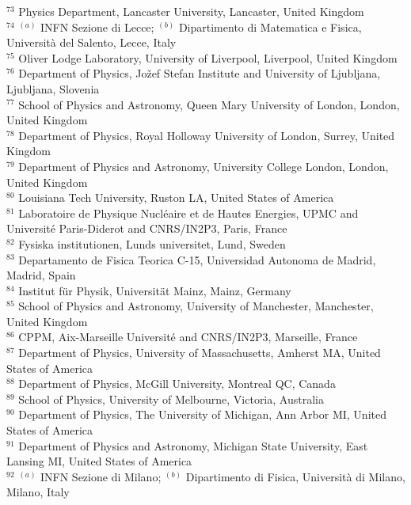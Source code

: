 \begin{flushleft}
$^{73}$ Physics Department, Lancaster University, Lancaster, United Kingdom\\
$^{74}$ $^{(a)}$ INFN Sezione di Lecce; $^{(b)}$ Dipartimento di Matematica e Fisica, Universit{\`a} del Salento, Lecce, Italy\\
$^{75}$ Oliver Lodge Laboratory, University of Liverpool, Liverpool, United Kingdom\\
$^{76}$ Department of Physics, Jo{\v{z}}ef Stefan Institute and University of Ljubljana, Ljubljana, Slovenia\\
$^{77}$ School of Physics and Astronomy, Queen Mary University of London, London, United Kingdom\\
$^{78}$ Department of Physics, Royal Holloway University of London, Surrey, United Kingdom\\
$^{79}$ Department of Physics and Astronomy, University College London, London, United Kingdom\\
$^{80}$ Louisiana Tech University, Ruston LA, United States of America\\
$^{81}$ Laboratoire de Physique Nucl{\'e}aire et de Hautes Energies, UPMC and Universit{\'e} Paris-Diderot and CNRS/IN2P3, Paris, France\\
$^{82}$ Fysiska institutionen, Lunds universitet, Lund, Sweden\\
$^{83}$ Departamento de Fisica Teorica C-15, Universidad Autonoma de Madrid, Madrid, Spain\\
$^{84}$ Institut f{\"u}r Physik, Universit{\"a}t Mainz, Mainz, Germany\\
$^{85}$ School of Physics and Astronomy, University of Manchester, Manchester, United Kingdom\\
$^{86}$ CPPM, Aix-Marseille Universit{\'e} and CNRS/IN2P3, Marseille, France\\
$^{87}$ Department of Physics, University of Massachusetts, Amherst MA, United States of America\\
$^{88}$ Department of Physics, McGill University, Montreal QC, Canada\\
$^{89}$ School of Physics, University of Melbourne, Victoria, Australia\\
$^{90}$ Department of Physics, The University of Michigan, Ann Arbor MI, United States of America\\
$^{91}$ Department of Physics and Astronomy, Michigan State University, East Lansing MI, United States of America\\
$^{92}$ $^{(a)}$ INFN Sezione di Milano; $^{(b)}$ Dipartimento di Fisica, Universit{\`a} di Milano, Milano, Italy\\

\end{flushleft}
